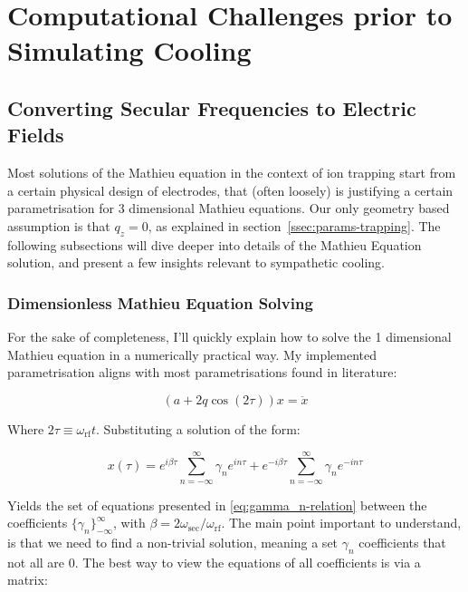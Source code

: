 \chapter{Computational Challenges prior to Simulating Cooling}

\section{Converting Secular Frequencies to Electric Fields}\label{sec:comp/freqs2aq}

Most solutions of the Mathieu equation in the context of ion trapping start from a certain physical design of electrodes, that (often loosely\cite{AkermanThesis}) is justifying a certain parametrisation for 3 dimensional Mathieu equations. Our only geometry based assumption is that $q_z = 0$, as explained in section~\ref{ssec:params-trapping}. The following subsections will dive deeper into details of the Mathieu Equation solution, and present a few insights relevant to sympathetic cooling. 

\subsection{Dimensionless Mathieu Equation Solving}\label{ssec:comp/mathieu}

For the sake of completeness, I'll quickly explain how to solve the 1 dimensional Mathieu equation in a numerically practical way. My implemented parametrisation aligns with most parametrisations found in literature:

\begin{equation}
	(a + 2 q \cos(2 \tau)) x = \ddot{x}
	\label{eq:bare-mathieu}
\end{equation}

Where $2\tau \equiv \omega_\mathrm{rf} t$. Substituting a solution of the form:

$$x(\tau) = e^{i\beta\tau}\sum_{n=-\infty}^\infty \gamma_n e^{i n \tau} + e^{-i\beta\tau}\sum_{n=-\infty}^\infty \gamma_n e^{-i n \tau} $$

Yields the set of equations presented in \ref{eq:gamma_n-relation} between the coefficients $\{\gamma_n\}_{-\infty}^\infty$, with $\beta = 2 \omega_\mathrm{sec}/\omega_\mathrm{rf}$. The main point important to understand, is that we need to find a non-trivial solution, meaning a set $\gamma_n$ coefficients that not all are $0$. The best way to view the equations of all coefficients is via a matrix:

